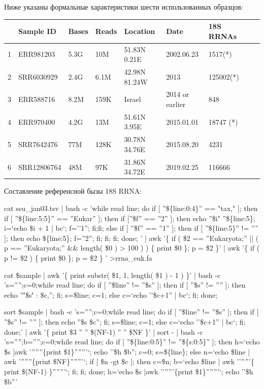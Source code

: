 \documentclass[a4paper]{article}
\begin{document}
Ниже указаны формальные характеристики шести использованных образцов:

\begin{tabular}{lllllllll}
\hline
&Sample ID&Bases&Reads&Location&Date&18S RRNAs\\
\hline
1&ERR981203&5.3G&10M&51.83N 0.21E&2002.06.23&1517(*)\\
2&SRR6030929&2.4G&6.1M&42.98N 81.24W&2013&125002(*)\\
3&ERR588716&8.2M&159K&Israel&2014 or earlier&848\\
4&ERR970400&4.2G&13M&51.61N 3.95E&2015.01.01&18747 (*)\\
5&SRR7642476&77M&128K&30.78N 34.76E&2015.08.20&4231\\
6&SRR12806764&48M&97K&31.86N 34.72E&2019.02.25&116666\\
\hline
\end{tabular}

Составление референсной бызы 18S RRNA:

cat ssu\_jan03.tsv | bash -c 'while read line; do if [ ''\$\{line:0:4\}'' == "tax," ]; then if [ ''\$\{line:5:5\}'' == ''Eukar'' ]; then if [''\$f'' == ''2'' ]; then echo ''\$i" ''\$\{line:5\}; i=`echo \$i + 1 | bc`; f=''1''; fi;fi;  else if [ ''\$f'' == ''1'' ]; then if [ ''\$\{line:5\}'' != '''' ]; then echo \$\{line:5\}; f=''2''; fi; fi; fi; done; ' | awk '\{ if ( \$2 == ''Eukaryota;'' || ( p == ''Eukaryota;'' \&\& length( \$0 ) > 100 ) ) \{ print \$0 \}; p = \$2 \}' | awk '\{ if ( p != \$2 ) \{ print \$0 \}; p = \$2 \} ' >rrna\_euk.fa

cat \$sample | awk '\{ print substr( \$1, 1, length( \$1 ) - 1 ) \}' | bash -c 's='''';c=0;while read line; do if [ ''\$line'' != ''\$s'' ]; then if [ ''\$s'' != '''' ]; then echo ''\''\$s\'' : \$c,''; fi; s=\$line; c=1; else c=`echo ''\$c+1'' | bc`; fi; done;

sort \$sample |  bash -c 's='''';c=0;while read line; do if [ ''\$line'' != ''\$s'' ]; then if [ ''\$s'' != '''' ]; then echo ''\$s \$c''; fi; s=\$line; c=1; else c=`echo ''\$c+1'' | bc`; fi; done;' | awk '\{ print \$3 '' '' \$(NF-1) '' '' \$NF \}' | sort - | bash -c 's='''';b='''';c=0;while read line; do if [ ''\$\{line:0:5\}'' != ''\$\{s:0:5\}'' ]; then h=`echo \$s |awk '''''''\{print \$1\}'''''''`; echo ''\$h \$b''; c=0; s=\$\{line\}; else n=`echo \$line | awk '''''''\{print \$NF\}'''''''`; if [ \$n -gt \$c ]; then c=\$n; b=`echo \$line | awk '''''''\{ print \$(NF-1) \}'''''''`; fi; fi; done; h=`echo \$s |awk '''''''\{print \$1\}'''''''`; echo ''\$h \$b'''
\end{document}

